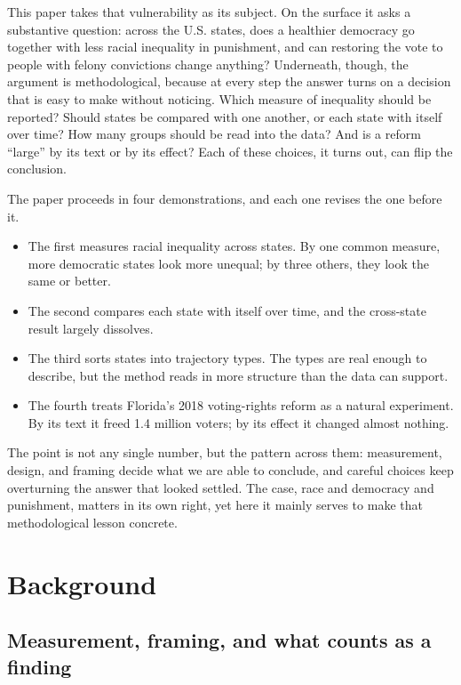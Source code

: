 \documentclass[
  12pt,
]{article}
\providecommand{\tightlist}{%
  \setlength{\itemsep}{0pt}\setlength{\parskip}{0pt}}
\begin{document}
This paper takes that vulnerability as its subject. On the surface it
asks a substantive question: across the U.S. states, does a healthier
democracy go together with less racial inequality in punishment, and can
restoring the vote to people with felony convictions change anything?
Underneath, though, the argument is methodological, because at every
step the answer turns on a decision that is easy to make without
noticing. Which measure of inequality should be reported? Should states
be compared with one another, or each state with itself over time? How
many groups should be read into the data? And is a reform ``large'' by
its text or by its effect? Each of these choices, it turns out, can flip
the conclusion.

The paper proceeds in four demonstrations, and each one revises the one
before it.

\begin{itemize}
\tightlist
\item
  The first measures racial inequality across states. By one common
  measure, more democratic states look more unequal; by three others,
  they look the same or better.
\item
  The second compares each state with itself over time, and the
  cross-state result largely dissolves.
\item
  The third sorts states into trajectory types. The types are real
  enough to describe, but the method reads in more structure than the
  data can support.
\item
  The fourth treats Florida's 2018 voting-rights reform as a natural
  experiment. By its text it freed 1.4 million voters; by its effect it
  changed almost nothing.
\end{itemize}

The point is not any single number, but the pattern across them:
measurement, design, and framing decide what we are able to conclude,
and careful choices keep overturning the answer that looked settled. The
case, race and democracy and punishment, matters in its own right, yet
here it mainly serves to make that methodological lesson concrete.

\section{Background}\label{background}

\subsection{Measurement, framing, and what counts as a
finding}\label{measurement-framing-and-what-counts-as-a-finding}
\end{document}
